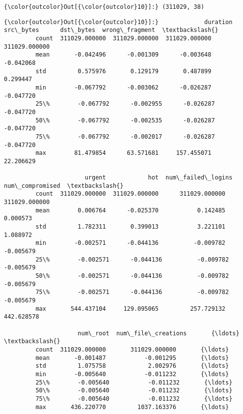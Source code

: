 \documentclass[11pt]{article}
\begin{document}
\begin{Verbatim}[commandchars=\\\{\}]
{\color{outcolor}Out[{\color{outcolor}10}]:} (311029, 38)
\end{Verbatim}
            
\begin{Verbatim}[commandchars=\\\{\}]
{\color{outcolor}Out[{\color{outcolor}10}]:}             duration      src\_bytes      dst\_bytes  wrong\_fragment  \textbackslash{}
         count  311029.000000  311029.000000  311029.000000   311029.000000   
         mean       -0.042496      -0.001309      -0.003648       -0.042068   
         std         0.575976       0.129179       0.487899        0.299447   
         min        -0.067792      -0.003062      -0.026287       -0.047720   
         25\%        -0.067792      -0.002955      -0.026287       -0.047720   
         50\%        -0.067792      -0.002535      -0.026287       -0.047720   
         75\%        -0.067792      -0.002017      -0.026287       -0.047720   
         max        81.479854      63.571681     157.455071       22.206629   
         
                       urgent            hot  num\_failed\_logins  num\_compromised  \textbackslash{}
         count  311029.000000  311029.000000      311029.000000    311029.000000   
         mean        0.006764      -0.025370           0.142485         0.000573   
         std         1.782311       0.399013           3.221101         1.088972   
         min        -0.002571      -0.044136          -0.009782        -0.005679   
         25\%        -0.002571      -0.044136          -0.009782        -0.005679   
         50\%        -0.002571      -0.044136          -0.009782        -0.005679   
         75\%        -0.002571      -0.044136          -0.009782        -0.005679   
         max       544.437104     129.095065         257.729132       442.628578   
         
                     num\_root  num\_file\_creations       {\ldots}        \textbackslash{}
         count  311029.000000       311029.000000       {\ldots}         
         mean       -0.001487           -0.001295       {\ldots}         
         std         1.075758            2.002976       {\ldots}         
         min        -0.005640           -0.011232       {\ldots}         
         25\%        -0.005640           -0.011232       {\ldots}         
         50\%        -0.005640           -0.011232       {\ldots}         
         75\%        -0.005640           -0.011232       {\ldots}         
         max       436.220770         1037.163376       {\ldots}         
         

\end{Verbatim}
\end{document}
